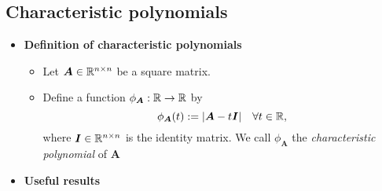 \documentclass[12pt,a4paper]{article}
\begin{document}
\subsection{Characteristic polynomials}

\begin{itemize}

\item \textbf{Definition of characteristic polynomials}
  \begin{itemize}
  \item Let $\bm{A}\in \mathbb{R}^{n\times n}$ be a square matrix.
  \item Define a function $\phi_{\bm{A}}:\mathbb{R} \to \mathbb{R}$ by
    \begin{equation}\nonumber%
      \phi_{\bm{A}}(t) := |\bm{A}-t\bm{I}| \quad \forall t\in \R,
    \end{equation}
    where $\bm{I}\in \mathbb{R}^{n\times n}$ is the identity matrix.
    We call $\phi_{\bm{A}}$ the \emph{characteristic polynomial} of $\bm{A}$
  \end{itemize}

\item \textbf{Useful results}


\end{itemize}
\end{document}
